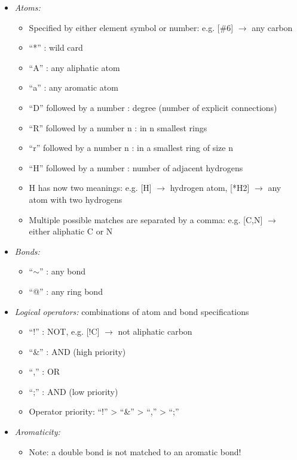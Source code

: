 \begin{itemize}
    \item \emph{Atoms:}
    \begin{itemize}
        \item Specified by either element symbol or number: e.g. [\#6] $\rightarrow$ any carbon
        \item “*” : wild card
        \item “A” : any aliphatic atom
        \item “a” : any aromatic atom
        \item “D” followed by a number : degree (number of explicit connections)
        \item “R” followed by a number n : in n smallest rings
        \item “r” followed by a number n : in a smallest ring of size n
        \item “H” followed by a number : number of adjacent hydrogens
        \item H has now two meanings: e.g. [H] $\rightarrow$ hydrogen atom, [*H2] $\rightarrow$ any atom with two hydrogens
        \item Multiple possible matches are separated by a comma: e.g. [C,N] $\rightarrow$ either aliphatic C or N
    \end{itemize}
    \item \emph{Bonds:}
    \begin{itemize}
        \item “$\sim$” : any bond
        \item “@” : any ring bond
    \end{itemize}
    \item \emph{Logical operators:} combinations of atom and bond specifications
    \begin{itemize}
        \item “!” : NOT, e.g. [!C] $\rightarrow$ not aliphatic carbon
        \item “\&” : AND (high priority)
        \item “,” : OR
        \item “;” : AND (low priority)
        \item Operator priority: “!” > “\&” > “,” > “;”
    \end{itemize}
    \item \emph{Aromaticity:}
    \begin{itemize}
        \item Note: a double bond is not matched to an aromatic bond!
    \end{itemize}
\end{itemize}

